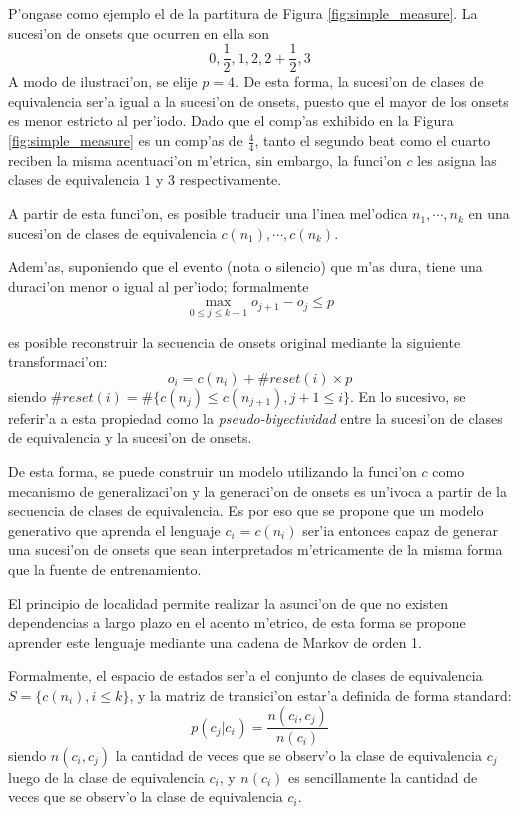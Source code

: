 P'ongase como ejemplo el de la partitura de Figura \ref{fig:simple_measure}. La sucesi'on de onsets que ocurren en ella son 
$$0, \frac{1}{2}, 1, 2, 2+\frac{1}{2}, 3$$ 
A modo de ilustraci'on, se elije $p=4$. De esta forma, la sucesi'on de clases de equivalencia ser'a igual a la sucesi'on de onsets, puesto que el mayor de los onsets es menor 
estricto al per'iodo. Dado que el comp'as exhibido en la Figura \ref{fig:simple_measure} es un comp'as de $\frac{4}{4}$, tanto el segundo beat 
como el cuarto reciben la misma acentuaci'on m'etrica, sin embargo, la funci'on $c$ les asigna las clases de equivalencia $1$ y $3$ respectivamente.


\begin{imagen}
\end{imagen}

A partir de esta funci'on, es posible traducir una l'inea mel'odica $n_1,\cdots,n_k$ en una sucesi'on de clases de equivalencia $c(n_1),\cdots,c(n_k)$. 

Adem'as, suponiendo que el evento (nota o silencio) que m'as dura, tiene una duraci'on menor o igual al per'iodo; formalmente 
$$\max_{0\leq j \leq k-1}o_{j+1}-o_j \leq p$$ 

es posible reconstruir la secuencia de onsets original mediante la siguiente transformaci'on:
$$o_i=c(n_i) + \#reset(i)\times p$$ siendo $\#reset(i)=\#\{c(n_j) \leq c(n_{j+1}), j+1 \leq i\}$. 
En lo sucesivo, se referir'a a esta propiedad como la \emph{pseudo-biyectividad} entre la sucesi'on de clases de equivalencia y la sucesi'on de onsets.

De esta forma, se puede construir un modelo utilizando la funci'on $c$ como mecanismo de generalizaci'on y la generaci'on de onsets es un'ivoca a partir de la secuencia de 
clases de equivalencia. Es por eso que se propone que un modelo generativo que aprenda el lenguaje $c_i=c(n_i)$ ser'ia entonces capaz de generar una sucesi'on de onsets 
que sean interpretados m'etricamente de la misma forma que la fuente de entrenamiento. 

El principio de localidad permite realizar la asunci'on de que no existen dependencias a largo plazo en el acento m'etrico, de esta forma se propone aprender este lenguaje mediante
una cadena de Markov de orden 1. 

Formalmente, el espacio de estados ser'a el conjunto de clases de equivalencia $S=\{c(n_i), i\leq k \}$, y la matriz de transici'on estar'a definida de forma standard:
$$p(c_j|c_i) = \frac{n(c_i, c_j)}{n(c_i)}$$
siendo $n(c_i, c_j)$ la cantidad de veces que se observ'o la clase de equivalencia $c_j$ luego de la clase de equivalencia $c_i$, y $n(c_i)$ es sencillamente la cantidad de 
veces que se observ'o la clase de equivalencia $c_i$.


